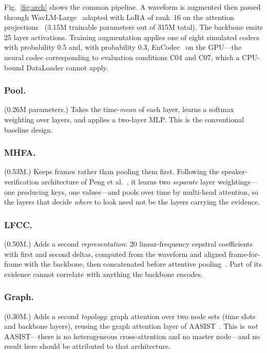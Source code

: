 \documentclass{llncs}
\begin{document}
Fig.~\ref{fig:arch} shows the common pipeline.  A waveform is augmented then
passed through WavLM-Large~\cite{wavlm} adapted with LoRA of rank~16 on the
attention projections~\cite{lora} (3.15M trainable parameters out of 315M
total).  The backbone emits 25 layer activations.  Training augmentation applies
one of eight simulated codecs with probability 0.5 and, with probability 0.3,
EnCodec~\cite{encodec} on the GPU---the neural codec corresponding to evaluation
conditions C04 and C07, which a CPU-bound DataLoader cannot apply.

\subsubsection{Pool.} (0.26M parameters.) Takes the time-\emph{mean} of each
layer, learns a softmax weighting over layers, and applies a two-layer MLP.
This is the conventional baseline design.

\subsubsection{MHFA.} (0.53M.) Keeps frames rather than pooling them first.
Following the speaker-verification architecture of Peng et al.~\cite{mhfa}, it
learns two \emph{separate} layer weightings---one producing keys, one
values---and pools over time by multi-head attention, so the layers that decide
\emph{where} to look need not be the layers carrying the evidence.

\subsubsection{LFCC.} (0.50M.) Adds a second \emph{representation}: 20
linear-frequency cepstral coefficients with first and second deltas, computed
from the waveform and aligned frame-for-frame with the backbone, then
concatenated before attentive pooling~\cite{attentive_pool}.  Part of its
evidence cannot correlate with anything the backbone encodes.

\subsubsection{Graph.} (0.30M.) Adds a second \emph{topology}: graph attention
over two node sets (time slots and backbone layers), reusing the graph attention
layer of AASIST~\cite{aasist}.  This is \emph{not} AASIST---there is no
heterogeneous cross-attention and no master node---and no result here should be
attributed to that architecture.
\end{document}
